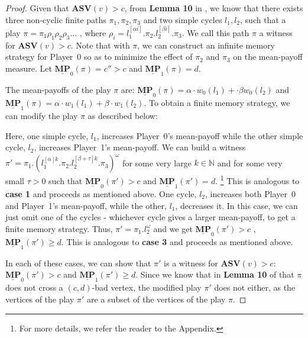 \begin{proof}
Given that $\mathbf{ASV}(v) > c$, from \textbf{Lemma 10} in \cite{FGR20}, we know that there exists three non-cyclic finite paths $\pi_1, \pi_2, \pi_3$ and two simple cycles $l_1, l_2$, such that a play $\pi = \pi_1\rho_1\rho_2\rho_3\dots$ , where $\rho_i = l_1^{[\alpha i]}.\pi_2.l_2^{[\beta i]}.\pi_3$. We call this path $\pi$ a witness for $\mathbf{ASV}(v) > c$. Note that with $\pi$, we can construct an infinite memory strategy for Player~0 so as to minimize the effect of $\pi_2$ and $\pi_3$ on the mean-payoff measure. Let $\underline{\mathbf{MP}}_0(\pi) = c'' > c$ and $\underline{\mathbf{MP}}_1(\pi) = d$.

\noindent The mean-payoffs of the play $\pi$ are: $\underline{\mathbf{MP}}_0(\pi) = \alpha \cdot w_0(l_1) + \cdot \beta w_0(l_2)$ and $\underline{\mathbf{MP}}_1(\pi) = \alpha \cdot w_1(l_1) + \beta \cdot w_1(l_2)$. To obtain a finite memory strategy, we can modify the play $\pi$ as described below:
\begin{caseof}
    Here, one simple cycle, $l_1$, increases Player~0's mean-payoff while the other simple cycle, $l_2$, increases Player~1's mean-payoff. We can build a witness $\pi' = \pi_1.(l_1^{[\alpha]k}.\pi_2.l_2^{[\beta+\tau]k}.\pi_3)^{\omega}$ for some very large $k \in \mathbb{N}$ and for some very small $\tau > 0$ such that $\underline{\mathbf{MP}}_0(\pi') > c$ and $\underline{\mathbf{MP}}_1(\pi') = d$. \footnote{For more details, we refer the reader to the Appendix.}
    This is analogous to \textbf{case 1} and proceeds as mentioned above.
    One cycle, $l_2$, increases both Player~0 and Player~1's mean-payoff, while the other, $l_1$, decreases it. In this case, we can just omit one of the cycles - whichever cycle gives a larger mean-payoff, to get a finite memory strategy. Thus, $\pi' = \pi_1.l_2^{\omega}$ and we get $\underline{\mathbf{MP}}_0(\pi') > c$ , $\underline{\mathbf{MP}}_1(\pi') \geqslant d$.
    This is analogous to \textbf{case 3} and proceeds as mentioned above.
\end{caseof}
In each of these cases, we can show that $\pi'$ is a witness for $\mathbf{ASV}(v) > c$: $\underline{\mathbf{MP}}_0(\pi') > c$ and $\underline{\mathbf{MP}}_1(\pi') \geqslant d$. Since we know that in \textbf{Lemma 10} of \cite{FGR20} that $\pi$ does not cross a $(c,d)$-bad vertex, the modified play $\pi'$ does not either, as the vertices of the play $\pi'$ are a subset of the vertices of the play $\pi$. 


\end{proof}
